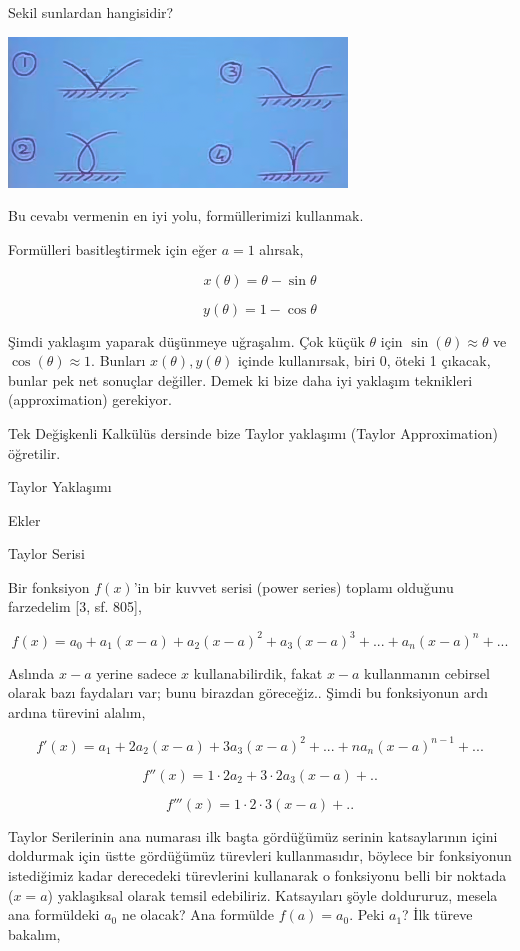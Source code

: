\documentclass[12pt,fleqn]{article}\usepackage{../../common}
\begin{document}
Sekil sunlardan hangisidir? 

\begin{center}
\includegraphics[height=4cm]{5_8.png}
\end{center}

Bu cevabı vermenin en iyi yolu, formüllerimizi kullanmak. 

Formülleri basitleştirmek için eğer $a=1$ alırsak, 

$$ x(\theta) = \theta - \sin \theta $$

$$ y(\theta) = 1 - \cos \theta $$

Şimdi yaklaşım yaparak düşünmeye uğraşalım. Çok küçük $\theta$ için
$\sin(\theta) \approx \theta$ ve $\cos(\theta) \approx 1$. Bunları $x(\theta),
y(\theta)$ içinde kullanırsak, biri 0, öteki 1 çıkacak, bunlar pek net sonuçlar
değiller. Demek ki bize daha iyi yaklaşım teknikleri (approximation) gerekiyor.

Tek Değişkenli Kalkülüs dersinde bize Taylor yaklaşımı (Taylor Approximation) 
öğretilir. 

Taylor Yaklaşımı

Ekler

Taylor Serisi

Bir fonksiyon $f(x)$'in bir kuvvet serisi (power series) toplamı olduğunu
farzedelim [3, sf. 805], 

$$ f(x) = a_0 + a_1(x-a) + a_2(x-a)^2 + a_3(x-a)^3 + ... + a_n (x-a)^n + ...$$

Aslında $x-a$ yerine sadece $x$ kullanabilirdik, fakat $x-a$ kullanmanın
cebirsel olarak bazı faydaları var; bunu birazdan göreceğiz.. Şimdi bu
fonksiyonun ardı ardına türevini alalım,

$$ f'(x) = a_1 +  2a_2(x-a) + 3a_3(x-a)^2 + ... + n a_n(x-a)^{n-1} + ...$$

$$ f''(x) = 1 \cdot 2a_2 + 3 \cdot 2a_3(x-a) + .. $$

$$ f'''(x) =  1 \cdot 2 \cdot 3 (x-a) + .. $$

Taylor Serilerinin ana numarası ilk başta gördüğümüz serinin katsaylarının içini
doldurmak için üstte gördüğümüz türevleri kullanmasıdır, böylece bir fonksiyonun
istediğimiz kadar derecedeki türevlerini kullanarak o fonksiyonu belli bir
noktada ($x=a$) yaklaşıksal olarak temsil edebiliriz. Katsayıları şöyle
doldururuz, mesela ana formüldeki $a_0$ ne olacak? Ana formülde $f(a)=a_0$. Peki
$a_1$? İlk türeve bakalım,
\end{document}
